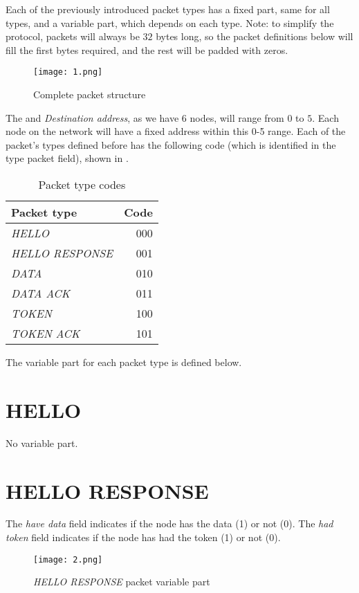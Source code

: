 Each of the previously introduced packet types has a fixed part, same for all types, and a variable part, which depends on each type. Note: to simplify the protocol, packets will always be $32$ bytes long, so the packet definitions below will fill the first bytes required, and the rest will be padded with zeros.

\begin{figure}[H] \centering
	\texttt{[image: 1.png]}
	\caption{Complete packet structure}
	\label{fig:1-png}
\end{figure}

The  and \textit{Destination address}, as we have 6 nodes, will range from $0$ to $5$. Each node on the network will have a fixed address within this 0-5 range. Each of the packet’s types defined before has the following code (which is identified in the type packet field), shown in .
\begin{table}[H]
	\centering
	\begin{tabular}{|l|r|} \hline
		Packet type & Code \\ \hline \hline	
		\textit{HELLO} & 000 \\ \hline
		\textit{HELLO RESPONSE} & 001 \\ \hline
		\textit{DATA} & 010 \\ \hline
		\textit{DATA ACK} & 011 \\ \hline
		\textit{TOKEN} & 100 \\ \hline
		\textit{TOKEN ACK} & 101 \\ \hline
	\end{tabular}
	\caption{Packet type codes}
	\label{tab:label}
\end{table}

The variable part for each packet type is defined below.


\section{HELLO}
No variable part.


\section{HELLO RESPONSE}
The \textit{have data} field indicates if the node has the data (1) or not (0). The \textit{had token} field indicates if the node has had the token (1) or not (0).

\begin{figure}[H] \centering
	\texttt{[image: 2.png]}
	\caption{\textit{HELLO RESPONSE} packet variable part}
	\label{fig:2-png}
\end{figure}

